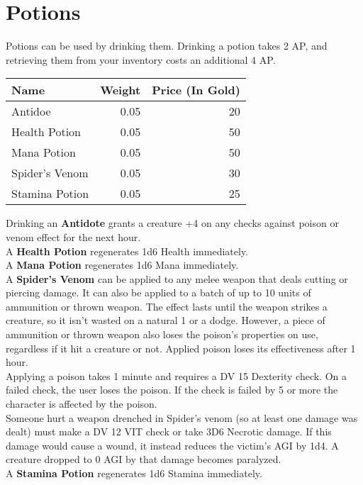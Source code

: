 \section{Potions}
Potions can be used by drinking them. Drinking a potion takes 2 AP, and retrieving them from your inventory costs an additional 4 AP.

\begin{longtable}{l | r | r}
	Name & Weight & Price (In Gold)\\ \hline
	Antidoe & 0.05 & 20\\
	Health Potion & 0.05 & 50\\
	Mana Potion & 0.05 & 50\\
	Spider's Venom & 0.05 & 30\\
	Stamina Potion & 0.05 & 25\\
\end{longtable}


Drinking an \textbf{Antidote} grants a creature +4 on any checks against poison or venom effect for the next hour.\\

A \textbf{Health Potion} regenerates 1d6 Health immediately.\\

A \textbf{Mana Potion} regenerates 1d6 Mana immediately.\\

A \textbf{Spider's Venom} can be applied to any melee weapon that deals cutting or piercing damage. It can also be applied to a batch of up to 10 units of ammunition or thrown weapon. The effect lasts until the weapon strikes a creature, so it isn't wasted on a natural 1 or a dodge. However, a piece of ammunition or thrown weapon also loses the poison's properties on use, regardless if it hit a creature or not. Applied poison loses its effectiveness after 1 hour.\\
Applying a poison takes 1 minute and requires a DV 15 Dexterity check. On a failed check, the user loses the poison. If the check is failed by 5 or more the character is affected by the poison.\\
Someone hurt a weapon drenched in Spider's venom (so at least one damage was dealt) must make a DV 12 VIT check or take 3D6 Necrotic damage. If this damage would cause a wound, it instead reduces the victim's AGI by 1d4. A creature dropped to 0 AGI by that damage becomes paralyzed.\\

A \textbf{Stamina Potion} regenerates 1d6 Stamina immediately.\\